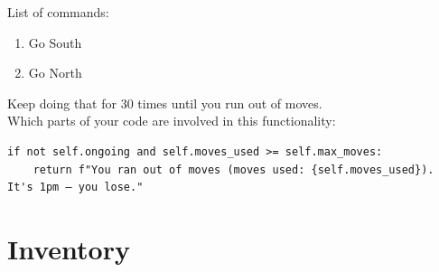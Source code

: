 \documentclass[11pt]{article}
\begin{document}
List of commands:
    \begin{enumerate}
        \item Go South
        \item Go North
    \end{enumerate}

Keep doing that for 30 times until you run out of moves.\\

Which parts of your code are involved in this functionality:

\begin{verbatim}
if not self.ongoing and self.moves_used >= self.max_moves:
    return f"You ran out of moves (moves used: {self.moves_used}). It's 1pm — you lose."
\end{verbatim}

\section*{Inventory}
\end{document}
